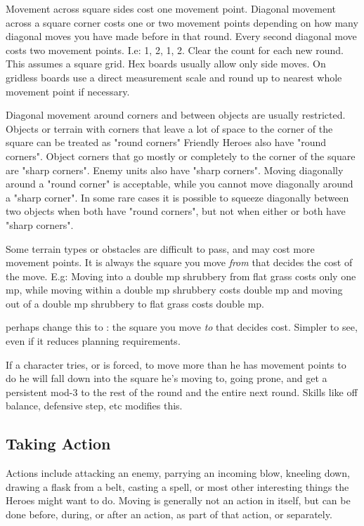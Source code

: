 Movement across square sides cost one movement point. Diagonal movement across a square corner costs one or two movement points depending on how many diagonal moves you have made before in that round. Every second diagonal move costs two movement points. I.e: 1, 2, 1, 2. Clear the count for each new round.
This assumes a square grid. Hex boards usually allow only side moves. On gridless boards use a direct measurement scale and round up to nearest whole movement point if necessary.

Diagonal movement around corners and between objects are usually restricted.
Objects or terrain with corners that leave a lot of space to the corner of the square can be treated as "round corners" Friendly Heroes also have "round corners".
Object corners that go mostly or completely to the corner of the square are "sharp corners". Enemy units also have "sharp corners".
Moving diagonally around a "round corner" is acceptable, while you cannot move diagonally around a "sharp corner". In some rare cases it is possible to squeeze diagonally between two objects when both have "round corners", but not when either or both have "sharp corners".

Some terrain types or obstacles are difficult to pass, and may cost more movement points. It is always the square you move \emph{from} that decides the cost of the move. E.g: Moving into a double mp shrubbery from flat grass costs only one mp, while moving within a double mp shrubbery costs double mp and moving out of a double mp shrubbery to flat grass costs double mp.

\todo perhaps change this to : the square you move \emph{to} that decides cost. Simpler to see, even if it reduces planning requirements.

If a character tries, or is forced, to move more than he has movement points to do he will fall down into the square he's moving to, going prone, and get a persistent mod-3 to the rest of the round and the entire next round. Skills like off balance, defensive step, etc modifies this.




\subsection*{Taking Action}
Actions include attacking an enemy, parrying an incoming blow, kneeling down, drawing a flask from a belt, casting a spell, or most other interesting things the Heroes might want to do. Moving is generally not an action in itself, but can be done before, during, or after an action, as part of that action, or separately.

